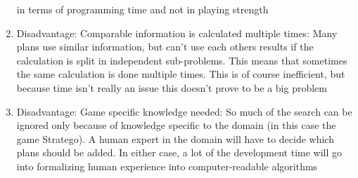 \documentclass{article}
\begin{document}
\begin{enumerate}
  in terms of programming time and not in playing strength 
  \item Disadvantage: Comparable information is calculated multiple times: Many plans use similar information, but can’t use each others results if the calculation is split in independent sub-problems. 
  This means that sometimes the same calculation is done multiple times. This is of course inefficient, but because time isn’t really an issue this doesn’t prove to be a big problem 
  \item Disadvantage: Game specific knowledge needed: So much of the search can be ignored only because of knowledge specific to the domain (in this case the game Stratego). 
  A human expert in the domain will have to decide which plans should be added. In either case, a lot of the development time will go into formalizing human experience into computer-readable algorithms 
\end{enumerate}
\end{document}
